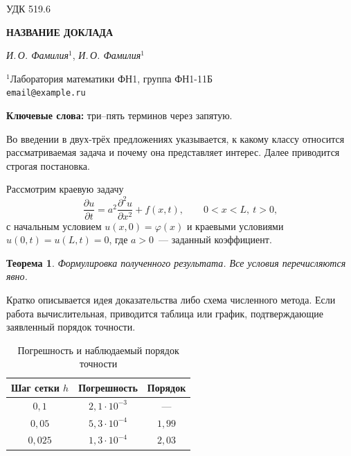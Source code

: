 \documentclass[12pt, a4paper]{article}
\theoremstyle{plain}
\newtheorem{theorem}{Теорема}
\begin{document}
\noindent УДК 519.6

\begin{center}
  {\large\bfseries НАЗВАНИЕ ДОКЛАДА}

  \vspace{0.5em}

  \textit{И.\,О. Фамилия}$^{1}$, \textit{И.\,О. Фамилия}$^{1}$

  \vspace{0.3em}

  {\small $^{1}$Лаборатория математики ФН1, группа ФН1-11Б\\
  \texttt{email@example.ru}}
\end{center}

\vspace{0.8em}

\noindent\textbf{Ключевые слова:} три--пять терминов через запятую.

\vspace{0.8em}

Во введении в двух-трёх предложениях указывается, к какому классу относится
рассматриваемая задача и почему она представляет интерес. Далее приводится
строгая постановка.

Рассмотрим краевую задачу
\begin{equation}\label{eq:main}
  \frac{\partial u}{\partial t} = a^2\frac{\partial^2 u}{\partial x^2} + f(x, t),
  \qquad 0 < x < L,\ t > 0,
\end{equation}
с начальным условием $u(x, 0) = \varphi(x)$ и краевыми условиями
$u(0, t) = u(L, t) = 0$, где $a > 0$~--- заданный коэффициент.

\begin{theorem}
  Формулировка полученного результата. Все условия перечисляются явно.
\end{theorem}

Кратко описывается идея доказательства либо схема численного метода.
Если работа вычислительная, приводится таблица или график, подтверждающие
заявленный порядок точности.

\begin{table}[h]
  \centering
  \small
  \caption{Погрешность и наблюдаемый порядок точности}
  \begin{tabular}{|c|c|c|}
    \hline
    Шаг сетки $h$ & Погрешность & Порядок \\
    \hline
    $0{,}1$    & $2{,}1\cdot10^{-3}$ & ---      \\
    $0{,}05$   & $5{,}3\cdot10^{-4}$ & $1{,}99$ \\
    $0{,}025$  & $1{,}3\cdot10^{-4}$ & $2{,}03$ \\
    \hline
  \end{tabular}
\end{table}
\end{document}
